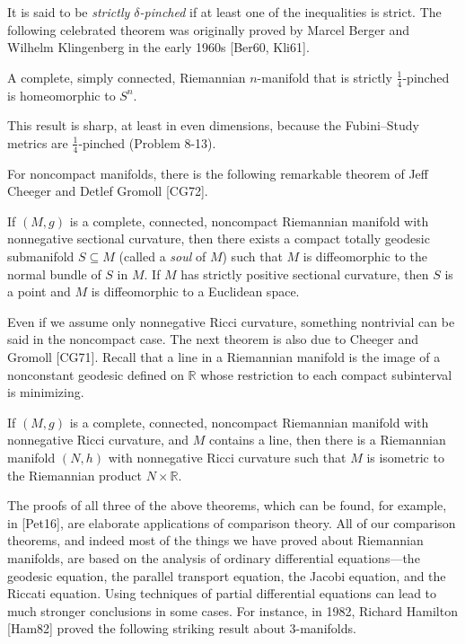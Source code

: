 It is said to be \textit{strictly $\delta$-pinched} if at least one of the inequalities is strict. The following celebrated theorem was originally proved by Marcel Berger and Wilhelm Klingenberg in the early 1960s [Ber60, Kli61].

\begin{theorem}
\label{thm:sphere-theorem}
A complete, simply connected, Riemannian $n$-manifold that is strictly $\frac{1}{4}$-pinched is homeomorphic to $S^n$.
\end{theorem}

This result is sharp, at least in even dimensions, because the Fubini--Study metrics are $\frac{1}{4}$-pinched (Problem 8-13).

For noncompact manifolds, there is the following remarkable theorem of Jeff Cheeger and Detlef Gromoll [CG72].

\begin{theorem}
\label{thm:soul-theorem}
If $(M, g)$ is a complete, connected, noncompact Riemannian manifold with nonnegative sectional curvature, then there exists a compact totally geodesic submanifold $S \subseteq M$ (called a \textit{soul} of $M$) such that $M$ is diffeomorphic to the normal bundle of $S$ in $M$. If $M$ has strictly positive sectional curvature, then $S$ is a point and $M$ is diffeomorphic to a Euclidean space.
\end{theorem}

Even if we assume only nonnegative Ricci curvature, something nontrivial can be said in the noncompact case. The next theorem is also due to Cheeger and Gromoll [CG71]. Recall that a line in a Riemannian manifold is the image of a nonconstant geodesic defined on $\mathbb{R}$ whose restriction to each compact subinterval is minimizing.

\begin{theorem}
\label{thm:splitting-theorem}
If $(M, g)$ is a complete, connected, noncompact Riemannian manifold with nonnegative Ricci curvature, and $M$ contains a line, then there is a Riemannian manifold $(N, h)$ with nonnegative Ricci curvature such that $M$ is isometric to the Riemannian product $N \times \mathbb{R}$.
\end{theorem}

The proofs of all three of the above theorems, which can be found, for example, in [Pet16], are elaborate applications of comparison theory. All of our comparison theorems, and indeed most of the things we have proved about Riemannian manifolds, are based on the analysis of ordinary differential equations---the geodesic equation, the parallel transport equation, the Jacobi equation, and the Riccati equation. Using techniques of partial differential equations can lead to much stronger conclusions in some cases. For instance, in 1982, Richard Hamilton [Ham82] proved the following striking result about $3$-manifolds.

